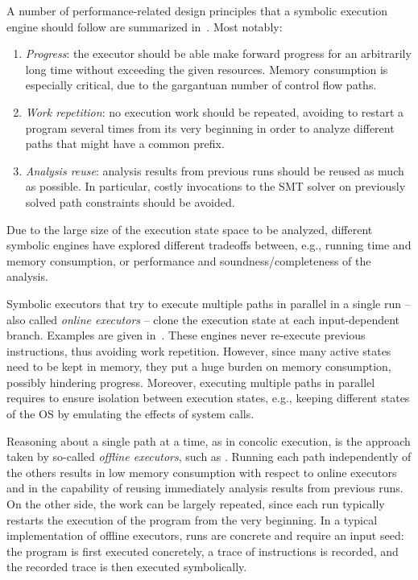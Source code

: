 A number of performance-related design principles that a symbolic execution engine should follow are  summarized in~\cite{MAYHEM-SP12}. Most notably:
\begin{enumerate}
  \item {\em Progress}: the executor should be able make forward progress for an arbitrarily long time without exceeding the given resources. Memory consumption is especially critical, due to the gargantuan number of control flow paths.
  \item {\em Work repetition}: no execution work should be repeated, avoiding to restart a program several times from its very beginning in order to analyze different paths that might have a  common prefix.
  \item {\em Analysis reuse}: analysis results from previous runs should be reused as much as possible. In particular, costly invocations to the SMT solver on  previously solved path constraints should be avoided.
\end{enumerate}

\noindent Due to the large size of the execution state space to be analyzed, different symbolic engines have explored different tradeoffs between, e.g., running time and memory consumption, or performance and soundness/completeness of the analysis.

Symbolic executors that try to execute multiple paths in parallel in a single run -- also called {\em online executors} -- clone the execution state at each input-dependent branch. Examples are given in~\cite{KLEE-OSDI08,AEG-NDSS11,CKC-TOCS12}. These engines never re-execute previous instructions, thus avoiding work repetition. However, since many active states need to be kept in memory, they put a huge burden on memory consumption, possibly hindering progress. Moreover, executing multiple paths in parallel requires to ensure isolation between execution states, e.g., keeping different states of the OS by emulating the effects of system calls.

Reasoning about a single path at a time, as in concolic execution, is the approach taken by so-called {\em offline executors}, such as \cite{SAGE-NDSS08}. Running each path independently of the others results in low memory consumption with respect to online executors and in the capability of reusing immediately analysis results from previous runs. On the other side, the work can be largely repeated, since each run typically restarts the execution of the program from the very beginning. In a typical implementation of offline executors, runs are concrete and require an input seed: the program is first executed concretely, a trace of instructions is recorded, and the recorded trace is then executed symbolically.

